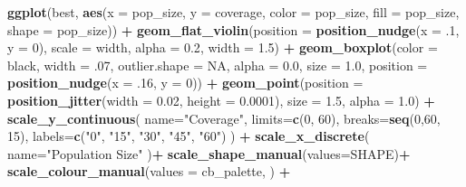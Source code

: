 \documentclass[
]{book}
\newenvironment{Shaded}{\begin{snugshade}}{\end{snugshade}}
\newcommand{\AttributeTok}[1]{\textcolor[rgb]{0.13,0.29,0.53}{#1}}
\newcommand{\ConstantTok}[1]{\textcolor[rgb]{0.56,0.35,0.01}{#1}}
\newcommand{\DecValTok}[1]{\textcolor[rgb]{0.00,0.00,0.81}{#1}}
\newcommand{\FloatTok}[1]{\textcolor[rgb]{0.00,0.00,0.81}{#1}}
\newcommand{\FunctionTok}[1]{\textcolor[rgb]{0.13,0.29,0.53}{\textbf{#1}}}
\newcommand{\NormalTok}[1]{#1}
\newcommand{\SpecialCharTok}[1]{\textcolor[rgb]{0.81,0.36,0.00}{\textbf{#1}}}
\newcommand{\StringTok}[1]{\textcolor[rgb]{0.31,0.60,0.02}{#1}}
\begin{document}
\begin{Shaded}
\begin{Highlighting}[]
\FunctionTok{ggplot}\NormalTok{(best, }\FunctionTok{aes}\NormalTok{(}\AttributeTok{x =}\NormalTok{ pop\_size, }\AttributeTok{y =}\NormalTok{ coverage, }\AttributeTok{color =}\NormalTok{ pop\_size, }\AttributeTok{fill =}\NormalTok{ pop\_size, }\AttributeTok{shape =}\NormalTok{ pop\_size)) }\SpecialCharTok{+}
  \FunctionTok{geom\_flat\_violin}\NormalTok{(}\AttributeTok{position =} \FunctionTok{position\_nudge}\NormalTok{(}\AttributeTok{x =}\NormalTok{ .}\DecValTok{1}\NormalTok{, }\AttributeTok{y =} \DecValTok{0}\NormalTok{), }\AttributeTok{scale =} \StringTok{\textquotesingle{}width\textquotesingle{}}\NormalTok{, }\AttributeTok{alpha =} \FloatTok{0.2}\NormalTok{, }\AttributeTok{width =} \FloatTok{1.5}\NormalTok{) }\SpecialCharTok{+}
  \FunctionTok{geom\_boxplot}\NormalTok{(}\AttributeTok{color =} \StringTok{\textquotesingle{}black\textquotesingle{}}\NormalTok{, }\AttributeTok{width =}\NormalTok{ .}\DecValTok{07}\NormalTok{, }\AttributeTok{outlier.shape =} \ConstantTok{NA}\NormalTok{, }\AttributeTok{alpha =} \FloatTok{0.0}\NormalTok{, }\AttributeTok{size =} \FloatTok{1.0}\NormalTok{, }\AttributeTok{position =} \FunctionTok{position\_nudge}\NormalTok{(}\AttributeTok{x =}\NormalTok{ .}\DecValTok{16}\NormalTok{, }\AttributeTok{y =} \DecValTok{0}\NormalTok{)) }\SpecialCharTok{+}
  \FunctionTok{geom\_point}\NormalTok{(}\AttributeTok{position =} \FunctionTok{position\_jitter}\NormalTok{(}\AttributeTok{width =} \FloatTok{0.02}\NormalTok{, }\AttributeTok{height =} \FloatTok{0.0001}\NormalTok{), }\AttributeTok{size =} \FloatTok{1.5}\NormalTok{, }\AttributeTok{alpha =} \FloatTok{1.0}\NormalTok{) }\SpecialCharTok{+}
  \FunctionTok{scale\_y\_continuous}\NormalTok{(}
    \AttributeTok{name=}\StringTok{"Coverage"}\NormalTok{,}
    \AttributeTok{limits=}\FunctionTok{c}\NormalTok{(}\DecValTok{0}\NormalTok{, }\DecValTok{60}\NormalTok{),}
    \AttributeTok{breaks=}\FunctionTok{seq}\NormalTok{(}\DecValTok{0}\NormalTok{,}\DecValTok{60}\NormalTok{, }\DecValTok{15}\NormalTok{),}
    \AttributeTok{labels=}\FunctionTok{c}\NormalTok{(}\StringTok{"0"}\NormalTok{, }\StringTok{"15"}\NormalTok{, }\StringTok{"30"}\NormalTok{, }\StringTok{"45"}\NormalTok{, }\StringTok{"60"}\NormalTok{)}
\NormalTok{  ) }\SpecialCharTok{+}
  \FunctionTok{scale\_x\_discrete}\NormalTok{(}
    \AttributeTok{name=}\StringTok{"Population Size"}
\NormalTok{  )}\SpecialCharTok{+}
  \FunctionTok{scale\_shape\_manual}\NormalTok{(}\AttributeTok{values=}\NormalTok{SHAPE)}\SpecialCharTok{+}
  \FunctionTok{scale\_colour\_manual}\NormalTok{(}\AttributeTok{values =}\NormalTok{ cb\_palette, ) }\SpecialCharTok{+}

\end{Highlighting}
\end{Shaded}
\end{document}
